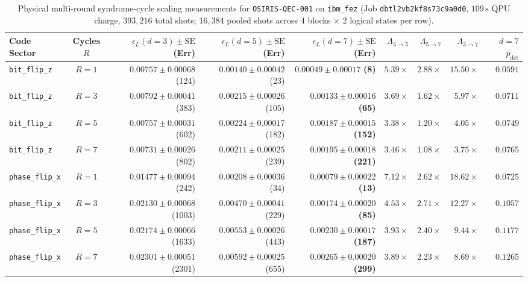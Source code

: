 \documentclass[11pt,twocolumn]{article}
\begin{document}
\begin{table}[t]
\centering
\caption{Physical multi-round syndrome-cycle scaling measurements for \texttt{OSIRIS-QEC-001} on \texttt{ibm\_fez} (Job \texttt{dbtl2vb2kf8s73c9a0d0}, $109\,\text{s}$ QPU charge, $393{,}216$ total shots; $16{,}384$ pooled shots across $4$ blocks $\times$ $2$ logical states per row).}
\label{tab:scaling}
\footnotesize
\begin{tabular}{@{}lcrrrrrrr@{}}
\toprule
\textbf{Code Sector} & \textbf{Cycles $R$} & \textbf{$\epsilon_L(d=3) \pm \mathrm{SE}$ (Err)} & \textbf{$\epsilon_L(d=5) \pm \mathrm{SE}$ (Err)} & \textbf{$\epsilon_L(d=7) \pm \mathrm{SE}$ (Err)} & \textbf{$\Lambda_{3\to 5}$} & \textbf{$\Lambda_{5\to 7}$} & \textbf{$\Lambda_{3\to 7}$} & \textbf{$d=7$ $\bar{p}_{\mathrm{det}}$} \\
\midrule
\texttt{bit\_flip\_z} & $R=1$ & $0.00757 \pm 0.00068$ (124) & $0.00140 \pm 0.00042$ (23)  & $\mathbf{0.00049 \pm 0.00017}$ \textbf{(8)}   & $5.39\times$ & $2.88\times$ & $\mathbf{15.50\times}$ & $0.0591$ \\
\texttt{bit\_flip\_z} & $R=3$ & $0.00792 \pm 0.00041$ (383) & $0.00215 \pm 0.00026$ (105) & $\mathbf{0.00133 \pm 0.00016}$ \textbf{(65)}  & $3.69\times$ & $1.62\times$ & $\mathbf{5.97\times}$  & $0.0711$ \\
\texttt{bit\_flip\_z} & $R=5$ & $0.00757 \pm 0.00031$ (602) & $0.00224 \pm 0.00017$ (182) & $\mathbf{0.00187 \pm 0.00015}$ \textbf{(152)} & $3.38\times$ & $1.20\times$ & $\mathbf{4.05\times}$  & $0.0749$ \\
\texttt{bit\_flip\_z} & $R=7$ & $0.00731 \pm 0.00026$ (802) & $0.00211 \pm 0.00025$ (239) & $\mathbf{0.00195 \pm 0.00018}$ \textbf{(221)} & $3.46\times$ & $1.08\times$ & $\mathbf{3.75\times}$  & $0.0765$ \\
\midrule
\texttt{phase\_flip\_x} & $R=1$ & $0.01477 \pm 0.00094$ (242)  & $0.00208 \pm 0.00036$ (34)  & $\mathbf{0.00079 \pm 0.00022}$ \textbf{(13)}  & $7.12\times$ & $2.62\times$ & $\mathbf{18.62\times}$ & $0.0725$ \\
\texttt{phase\_flip\_x} & $R=3$ & $0.02130 \pm 0.00068$ (1003) & $0.00470 \pm 0.00041$ (229) & $\mathbf{0.00174 \pm 0.00020}$ \textbf{(85)}  & $4.53\times$ & $2.71\times$ & $\mathbf{12.27\times}$ & $0.1057$ \\
\texttt{phase\_flip\_x} & $R=5$ & $0.02174 \pm 0.00066$ (1633) & $0.00553 \pm 0.00026$ (443) & $\mathbf{0.00230 \pm 0.00017}$ \textbf{(187)} & $3.93\times$ & $2.40\times$ & $\mathbf{9.44\times}$  & $0.1177$ \\
\texttt{phase\_flip\_x} & $R=7$ & $0.02301 \pm 0.00051$ (2301) & $0.00592 \pm 0.00025$ (655) & $\mathbf{0.00265 \pm 0.00020}$ \textbf{(299)} & $3.89\times$ & $2.23\times$ & $\mathbf{8.69\times}$  & $0.1265$ \\
\bottomrule
\end{tabular}
\end{table}
\end{document}
